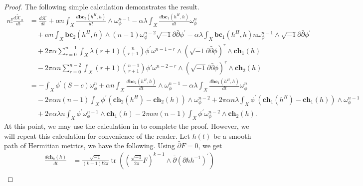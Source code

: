 \documentclass[10pt, letterpaper]{amsart}
\newcommand{\spbp}{\sqrt{-1}\partial \bar{\partial}}
\newcommand{\tr}{\operatorname{tr}}
\newcommand{\dbar}{\bar{\partial}}
\theoremstyle{plain}
\theoremstyle{definition}
\numberwithin{equation}{section}
\begin{document}
\begin{proof}
	The following simple calculation demonstrates the result.
	\begin{equation}
	\begin{split} 
	n!\frac{d\widetilde{\mathcal{K}}_\alpha}{dt}  
	& = \frac{d\mathcal{K}}{dt} +  \alpha n \int_ X \frac{d \mathbf{bc}_2 \left(h^H,h\right)}{dt}\wedge \omega_{\phi}^{n-1} -\alpha \lambda\int _{X} \frac{d \mathbf{bc}_1 \left(h^H,h\right)}{dt} \omega_{\phi}^n   \\
	&\quad + \alpha n \int_ X \mathbf{bc}_2 \left(h^H,h\right)\wedge (n-1) \omega_{\phi}^{n-2} \spbp \phi^{'}\nonumber
	-\alpha\lambda \int _{X} \mathbf{bc}_1 \left(h^H,h\right) n\omega_{\phi}^{n-1}\wedge\spbp \phi^{'}\\
	&\quad +  2\pi \alpha \sum_{r=0}^{n-1} \int _X \lambda (r+1) \binom{n}{r+1} \phi^{'} \omega ^{n-1-r}\wedge  \left(\spbp \phi\right)^{r}\wedge \mathbf{ch}_1\left(h\right)  \\
	&\quad -  2 \pi \alpha n \sum _{r=0}^{n-2} \int _X  (r+1)\binom{n-1}{r+1} \phi'  \omega ^{n-2-r} \wedge\left(\spbp \phi\right)^{r} \wedge\mathbf{ch}_2\left(h\right)\\
	& = -  \int _X \phi^{'} (S-c) \omega_{\phi}^n + \displaystyle \alpha n \int_ X \frac{d \mathbf{bc}_2 \left(h^H,h\right)}{dt} \wedge \omega_{\phi}^{n-1} -\alpha \lambda \int _{X} \frac{d \mathbf{bc}_1 \left(h^H,h\right)}{dt} \omega_{\phi}^n \\
	&\quad -2\pi  \alpha n(n-1) \int_ X \phi^{'} \left( \mathbf{ch}_2 \left( h^H \right)-\mathbf{ch}_2\left(h\right) \right)\wedge \omega_{\phi}^{n-2} 
	+2\pi\alpha n \lambda \int _{X} \phi^{'} \left( \mathbf{ch}_1\left(h^H\right)-\mathbf{ch}_1\left(h\right)\right) \wedge\omega_{\phi}^{n-1}\\
	& \quad + 2\pi \alpha \lambda n \int _X  \phi^{'}\omega_{\phi}^{n-1} \wedge \mathbf{ch}_1\left(h\right)  - 2 \pi \alpha n(n-1)\int _X\phi^{'} \omega_{\phi}^{n-2}\wedge \mathbf{ch}_2\left(h\right) .
	\label{calc}
	\end{split}
	\end{equation}
	At this point, we may use the calculation in \cite{donald} to complete the proof. However, we will repeat this calculation for convenience of the reader.  Let $h(t)$ be a smooth path of Hermitian metrics, we have the following. Using $\dbar F=0$, we get
	\begin{equation}
	\begin{split}
	\frac{d \mathbf{ch}_k(h)}{dt} 
	& = \frac{\sqrt{-1}}{(k-1)!2\pi} \tr \left ( \left (\frac{\sqrt{-1}}{2\pi}F \right)^{k-1} \wedge\dbar \left (\partial h h^{-1} \right) ^{'}\right) \\

\end{split}
\end{equation}
\end{proof}
\end{document}
